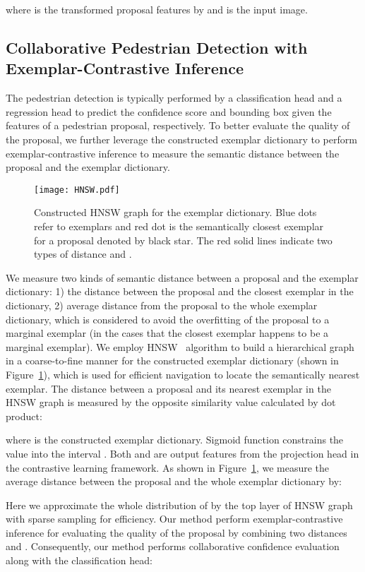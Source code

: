 \documentclass[journal]{IEEEtran}
\begin{document}
where  is the transformed proposal features by  and  is the input image.


\subsection{Collaborative Pedestrian Detection with Exemplar-Contrastive Inference}
The pedestrian detection is typically performed by a classification head and a regression head to predict the confidence score and bounding box given the features of a pedestrian proposal, respectively.  To better evaluate the quality of the proposal, we further leverage the constructed exemplar dictionary to perform exemplar-contrastive inference to measure the semantic distance between the proposal and the exemplar dictionary. 

\begin{figure}[t]
\centering
    \texttt{[image: HNSW.pdf]}
\caption{Constructed HNSW graph for the exemplar dictionary. Blue dots refer to exemplars and red dot is the semantically closest exemplar for a proposal denoted by black star. The red solid lines indicate two types of distance  and .
    }
\label{Fig:hnsw}
\end{figure}

We measure two kinds of semantic distance between a proposal and the exemplar dictionary: 1) the distance between the proposal and the closest exemplar in the dictionary, 2) average distance from the proposal to the whole exemplar dictionary, which is considered to avoid the overfitting of the proposal to a marginal exemplar (in the cases that the closest exemplar happens to be a marginal exemplar). We employ HNSW~\cite{malkov2018efficient} algorithm to build a hierarchical graph in a coarse-to-fine manner for the constructed exemplar dictionary (shown in Figure~\ref{Fig:hnsw}), which is used for efficient navigation to locate the semantically nearest exemplar. The distance  between a proposal  and its nearest exemplar  in the HNSW graph is measured by the opposite similarity value calculated by dot product:

where  is the constructed exemplar dictionary. Sigmoid function  constrains the value into the interval . Both  and  are output features from the projection head  in the contrastive learning framework. As shown in Figure~\ref{Fig:hnsw}, we measure the average distance  between the proposal and the whole exemplar dictionary by:

Here we approximate the whole distribution of  by the top layer of HNSW graph with sparse sampling for efficiency. Our method perform exemplar-contrastive inference for evaluating the quality of the proposal   by combining two distances  and . Consequently, our method performs collaborative confidence evaluation along with the classification head:
\end{document}
